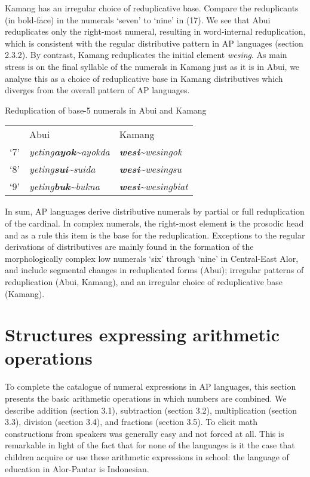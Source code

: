 
Kamang has an irregular choice of reduplicative base. Compare the reduplicants (in bold-face) in the numerals `seven' to `nine' in (17). We see that Abui reduplicates only the right-most numeral, resulting in word-internal reduplication, which is consistent with the regular distributive pattern in AP languages (section 2.3.2). By contrast, Kamang reduplicates the initial element \textit{wesing}. As main stress is on the final syllable of the numerals in Kamang just as it is in Abui, we analyse this as a choice of reduplicative base in Kamang distributives which diverges from the overall pattern of AP languages.

\ea
Reduplication of base-5 numerals in Abui and Kamang\\
\begin{tabular}{lll}
   &  Abui   &     Kamang\\
  `7' &  \textit{yeting}\textbf{\textit{ayok}}\textit{\~{}ayokda}  &   \textbf{\textit{wesi}}\textit{\~{}wesingok}\\
  `8' &  \textit{yeting}\textbf{\textit{sui}}\textit{\~{}suida}& \textbf{\textit{wesi}}\textit{\~{}wesingsu}\\
  `9' &  \textit{yeting}\textbf{\textit{buk}}\textit{\~{}bukna}& \textbf{\textit{wesi}}\textit{\~{}wesingbiat}\\
\end{tabular}
\z


In sum, AP languages derive distributive numerals by partial or full reduplication of the cardinal. In complex numerals, the right-most element is the prosodic head and as a rule this item is the base for the reduplication. Exceptions to the regular derivations of distributives are mainly found in the formation of the morphologically complex low numerals `six' through `nine' in Central-East Alor, and include segmental changes in reduplicated forms (Abui); irregular patterns of reduplication (Abui, Kamang), and an irregular choice of reduplicative base (Kamang).

\section{Structures expressing arithmetic operations}
To complete the catalogue of numeral expressions in AP languages, this section presents the basic arithmetic operations in which numbers are combined. We describe addition (section 3.1), subtraction (section 3.2), multiplication (section 3.3), division (section 3.4), and fractions (section 3.5). To elicit math constructions from speakers was generally easy and not forced at all. This is remarkable in light of the fact that for none of the languages is it the case that children acquire or use these arithmetic expressions in school: the language of education in Alor-Pantar is Indonesian.


